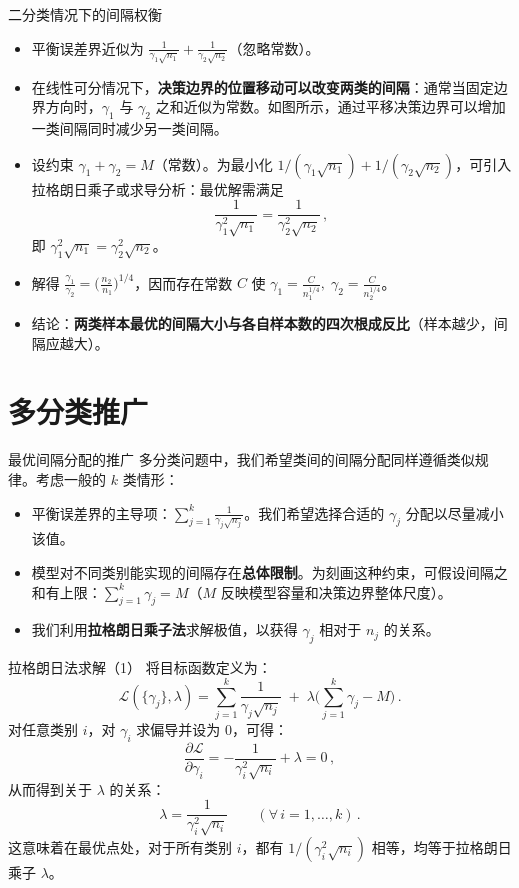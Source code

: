 \documentclass{beamer}
\begin{document}
\begin{frame}{二分类情况下的间隔权衡}
    \begin{itemize}
        \item 平衡误差界近似为 $ \frac{1}{\gamma_1\sqrt{n_1}} + \frac{1}{\gamma_2\sqrt{n_2}} $（忽略常数）。
        \item 在线性可分情况下，\textbf{决策边界的位置移动可以改变两类的间隔}：通常当固定边界方向时，$\gamma_1$ 与 $\gamma_2$ 之和近似为常数。如图所示，通过平移决策边界可以增加一类间隔同时减少另一类间隔。
        \item 设约束 $\gamma_1 + \gamma_2 = M$（常数）。为最小化 $1/(\gamma_1\sqrt{n_1}) + 1/(\gamma_2\sqrt{n_2})$，可引入拉格朗日乘子或求导分析：最优解需满足
        \[
            \frac{1}{\gamma_1^2\sqrt{n_1}} = \frac{1}{\gamma_2^2\sqrt{n_2}}\,,
        \] 
        即 $\gamma_1^2 \sqrt{n_1} = \gamma_2^2 \sqrt{n_2}$。
        \item 解得\; $\displaystyle \frac{\gamma_1}{\gamma_2} = \Big(\frac{n_2}{\,n_1}\Big)^{1/4}$，因而存在常数 $C$ 使 $\gamma_1 = \frac{C}{n_1^{1/4}},\;\gamma_2 = \frac{C}{n_2^{1/4}}$。
        \item 结论：\textbf{两类样本最优的间隔大小与各自样本数的四次根成反比}（样本越少，间隔应越大）。
    \end{itemize}
\end{frame}

\section{多分类推广}
\begin{frame}{最优间隔分配的推广}
    多分类问题中，我们希望类间的间隔分配同样遵循类似规律。考虑一般的 $k$ 类情形：
    \begin{itemize}
        \item 平衡误差界的主导项：$\sum_{j=1}^k \frac{1}{\gamma_j\sqrt{n_j}}$。我们希望选择合适的 $\gamma_j$ 分配以尽量减小该值。
        \item 模型对不同类别能实现的间隔存在\textbf{总体限制}。为刻画这种约束，可假设间隔之和有上限：$\sum_{j=1}^k \gamma_j = M$（$M$ 反映模型容量和决策边界整体尺度）。
        \item 我们利用\textbf{拉格朗日乘子法}求解极值，以获得 $\gamma_j$ 相对于 $n_j$ 的关系。
    \end{itemize}
\end{frame}

\begin{frame}{拉格朗日法求解（1）}
    将目标函数定义为：
    \[
        \mathcal{L}(\{\gamma_j\}, \lambda) = \sum_{j=1}^k \frac{1}{\gamma_j\sqrt{n_j}}\;+\; \lambda\Big(\sum_{j=1}^k \gamma_j - M\Big)\,.
    \]
    对任意类别 $i$，对 $\gamma_i$ 求偏导并设为 0，可得：
    \[
        \frac{\partial \mathcal{L}}{\partial \gamma_i} = -\frac{1}{\gamma_i^2 \sqrt{n_i}} + \lambda = 0\,,
    \] 
    从而得到关于 $\lambda$ 的关系：
    \[
        \lambda = \frac{1}{\gamma_i^2\sqrt{n_i}}\qquad (\forall\,i=1,\dots,k)\,.
    \]
    这意味着在最优点处，对于所有类别 $i$，都有 $1/(\gamma_i^2\sqrt{n_i})$ 相等，均等于拉格朗日乘子 $\lambda$。
\end{frame}
\end{document}
